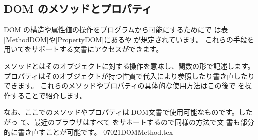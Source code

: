 \subsection{DOM のメソッドとプロパティ}
DOM の構造や属性値の操作をプログラムから可能にするために\DOM で
は表\ref{MethodDOM}や\ref{PropertyDOM}にあるや
が規定されています。
これらの手段を用いて\DOM をサポートする文書にアクセスができます。

メソッドとはそのオブジェクトに対する操作を意味し、関数の形で記述します。
プロパティはそのオブジェクトが持つ性質で代入により参照したり書き直したり
できます。
%
これらのメソッドやプロパティの具体的な使用方法はこの後で
\SVG を操作することで紹介します。

なお、ここでのメソッドやプロパティは DOM文書で使用可能なものです。したがっ
て、最近のブラウザはすべて\DOM{} をサポートするので同様の方法で\HTML 文
書も部分的に書き直すことが可能です。
 \CH 07021DOMMethod.tex

